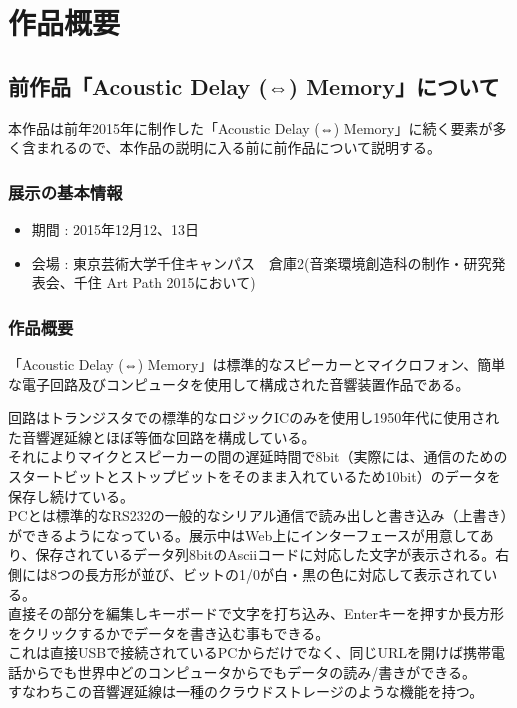 \chapter{作品概要}\label{ux4f5cux54c1ux6982ux8981}

\section{前作品「Acoustic Delay (⇔)
Memory」について}\label{ux524dux4f5cux54c1acoustic-delay-memoryux306bux3064ux3044ux3066}

本作品は前年2015年に制作した「Acoustic Delay (⇔)
Memory」に続く要素が多く含まれるので、本作品の説明に入る前に前作品について説明する。

\subsection{展示の基本情報}\label{ux5c55ux793aux306eux57faux672cux60c5ux5831}

\begin{itemize}
\tightlist
\item
  期間 : 2015年12月12、13日
\item
  会場 :
  東京芸術大学千住キャンパス　倉庫2(音楽環境創造科の制作・研究発表会、千住
  Art Path 2015において)
\end{itemize}

\subsection{作品概要}\label{ux4f5cux54c1ux6982ux8981-1}

「Acoustic Delay (⇔)
Memory」は標準的なスピーカーとマイクロフォン、簡単な電子回路及びコンピュータを使用して構成された音響装置作品である。

回路はトランジスタでの標準的なロジックICのみを使用し1950年代に使用された音響遅延線とほぼ等価な回路を構成している。\\
それによりマイクとスピーカーの間の遅延時間で8bit（実際には、通信のためのスタートビットとストップビットをそのまま入れているため10bit）のデータを保存し続けている。\\
PCとは標準的なRS232の一般的なシリアル通信で読み出しと書き込み（上書き）ができるようになっている。展示中はWeb上にインターフェースが用意してあり、保存されているデータ列8bitのAsciiコードに対応した文字が表示される。右側には8つの長方形が並び、ビットの1/0が白・黒の色に対応して表示されている。\\
直接その部分を編集しキーボードで文字を打ち込み、Enterキーを押すか長方形をクリックするかでデータを書き込む事もできる。\\
これは直接USBで接続されているPCからだけでなく、同じURLを開けば携帯電話からでも世界中どのコンピュータからでもデータの読み/書きができる。\\
すなわちこの音響遅延線は一種のクラウドストレージのような機能を持つ。

